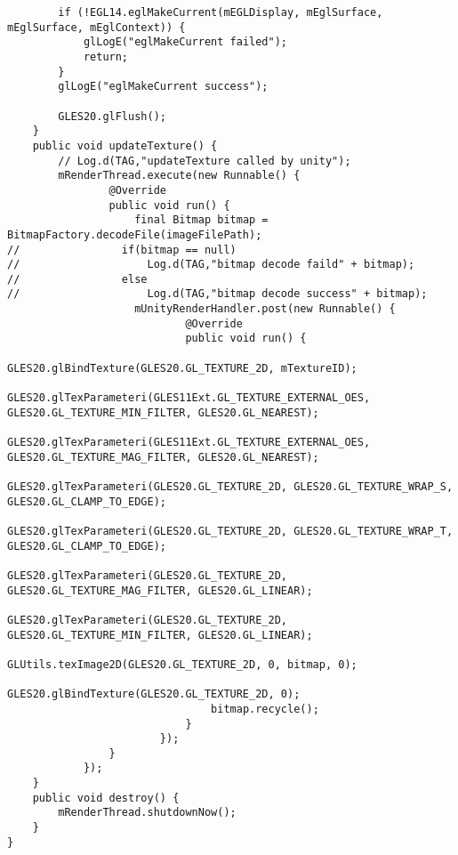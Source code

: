 \documentclass[9pt, b5paper]{article}
\begin{document}
\begin{verbatim}
        if (!EGL14.eglMakeCurrent(mEGLDisplay, mEglSurface, mEglSurface, mEglContext)) {
            glLogE("eglMakeCurrent failed");
            return;
        }
        glLogE("eglMakeCurrent success");

        GLES20.glFlush();
    }
    public void updateTexture() {
        // Log.d(TAG,"updateTexture called by unity");
        mRenderThread.execute(new Runnable() {
                @Override
                public void run() {
                    final Bitmap bitmap = BitmapFactory.decodeFile(imageFilePath);
//                if(bitmap == null)
//                    Log.d(TAG,"bitmap decode faild" + bitmap);
//                else
//                    Log.d(TAG,"bitmap decode success" + bitmap);
                    mUnityRenderHandler.post(new Runnable() {
                            @Override
                            public void run() {
                                GLES20.glBindTexture(GLES20.GL_TEXTURE_2D, mTextureID);
                                GLES20.glTexParameteri(GLES11Ext.GL_TEXTURE_EXTERNAL_OES, GLES20.GL_TEXTURE_MIN_FILTER, GLES20.GL_NEAREST);
                                GLES20.glTexParameteri(GLES11Ext.GL_TEXTURE_EXTERNAL_OES, GLES20.GL_TEXTURE_MAG_FILTER, GLES20.GL_NEAREST);
                                GLES20.glTexParameteri(GLES20.GL_TEXTURE_2D, GLES20.GL_TEXTURE_WRAP_S, GLES20.GL_CLAMP_TO_EDGE);
                                GLES20.glTexParameteri(GLES20.GL_TEXTURE_2D, GLES20.GL_TEXTURE_WRAP_T, GLES20.GL_CLAMP_TO_EDGE);
                                GLES20.glTexParameteri(GLES20.GL_TEXTURE_2D, GLES20.GL_TEXTURE_MAG_FILTER, GLES20.GL_LINEAR);
                                GLES20.glTexParameteri(GLES20.GL_TEXTURE_2D, GLES20.GL_TEXTURE_MIN_FILTER, GLES20.GL_LINEAR);
                                GLUtils.texImage2D(GLES20.GL_TEXTURE_2D, 0, bitmap, 0);
                                GLES20.glBindTexture(GLES20.GL_TEXTURE_2D, 0);
                                bitmap.recycle();
                            }
                        });
                }
            });
    }
    public void destroy() {
        mRenderThread.shutdownNow();
    }
}
\end{verbatim}
\end{document}
